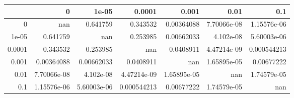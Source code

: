 \begin{tabular}{rrrrrrr}
\toprule
        &             0 &         1e-05 &        0.0001 &         0.001 &          0.01 &           0.1 \\
\midrule
 0      & nan           &   0.641759    &   0.343532    &   0.00364088  &   7.70066e-08 &   1.15576e-06 \\
 1e-05  &   0.641759    & nan           &   0.253985    &   0.00662033  &   4.102e-08   &   5.60003e-06 \\
 0.0001 &   0.343532    &   0.253985    & nan           &   0.0408911   &   4.47214e-09 &   0.000544213 \\
 0.001  &   0.00364088  &   0.00662033  &   0.0408911   & nan           &   1.65895e-05 &   0.00677222  \\
 0.01   &   7.70066e-08 &   4.102e-08   &   4.47214e-09 &   1.65895e-05 & nan           &   1.74579e-05 \\
 0.1    &   1.15576e-06 &   5.60003e-06 &   0.000544213 &   0.00677222  &   1.74579e-05 & nan           \\
\bottomrule
\end{tabular}